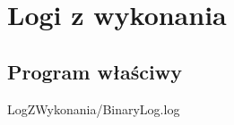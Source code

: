 \chapter{Logi z wykonania}
    \section{Program właściwy}
        
        {LogZWykonania/BinaryLog.log}

        
